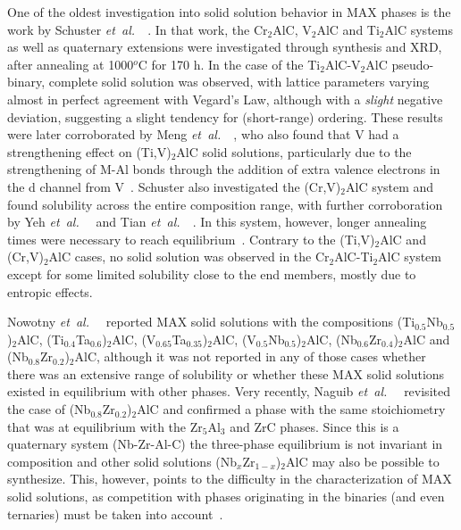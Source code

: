 \documentclass[preprint,amsmath,amssymb,aps, prb,showkeys]{revtex4-1}
\def\etal{\mbox{\it et al.\ }}
\begin{document}
One of the oldest investigation into solid solution behavior in MAX phases is the work by Schuster \etal~\cite{schuster1980ternary}. In that work, the Cr$_2$AlC, V$_2$AlC and Ti$_2$AlC systems as well as quaternary extensions were investigated through synthesis and XRD, after annealing at 1000$^o$C for 170 h. In the case of the Ti$_2$AlC-V$_2$AlC pseudo-binary, complete solid solution was observed, with lattice parameters varying almost in perfect agreement with Vegard's Law, although with a \emph{slight} negative deviation, suggesting a slight tendency for (short-range) ordering.  These results were later corroborated by Meng \etal~\cite{meng2005strengthening}, who also found that V had a strengthening effect on (Ti,V)$_2$AlC solid solutions, particularly due to the strengthening of M-Al bonds through the addition of extra valence electrons in the d channel from V~\cite{wang2004ab}. Schuster also investigated the (Cr,V)$_2$AlC system and found solubility across the entire composition range, with further 
corroboration by Yeh \etal~\cite{yeh2013formation} and Tian \etal~\cite{tian2009synthesis}. In this system, however, longer annealing times were necessary to reach equilibrium~\cite{schuster1980ternary}. Contrary to the (Ti,V)$_2$AlC and (Cr,V)$_2$AlC cases, no solid solution was observed in the Cr$_2$AlC-Ti$_2$AlC system~\cite{schuster1980ternary} except for some limited solubility close to the end members, mostly due to entropic effects.

Nowotny \etal~\cite{nowotny1982structural} reported MAX solid solutions with the compositions (Ti$_{0.5}$Nb$_{0.5}$)$_2$AlC, (Ti$_{0.4}$Ta$_{0.6}$)$_2$AlC,  (V$_{0.65}$Ta$_{0.35}$)$_2$AlC, (V$_{0.5}$Nb$_{0.5}$)$_2$AlC, (Nb$_{0.6}$Zr$_{0.4}$)$_2$AlC and (Nb$_{0.8}$Zr$_{0.2}$)$_2$AlC, although it was not reported in any of those cases whether there was an extensive range of solubility or whether these MAX solid solutions existed in equilibrium with other phases. Very recently, Naguib \etal~\cite{naguib2014new} revisited the case of (Nb$_{0.8}$Zr$_{0.2}$)$_2$AlC and confirmed a phase with the same stoichiometry that was at equilibrium with the Zr$_5$Al$_3$ and ZrC phases. Since this is a quaternary system (Nb-Zr-Al-C) the three-phase equilibrium is not invariant in composition and other solid solutions (Nb$_{x}$Zr$_{1-x}$)$_2$AlC may also be possible to synthesize. This, however, points to the difficulty in the characterization of MAX solid solutions, as competition with phases originating in the 
binaries (and even ternaries) must be taken into account~\cite{dahlqvist2010stability}.
\end{document}
